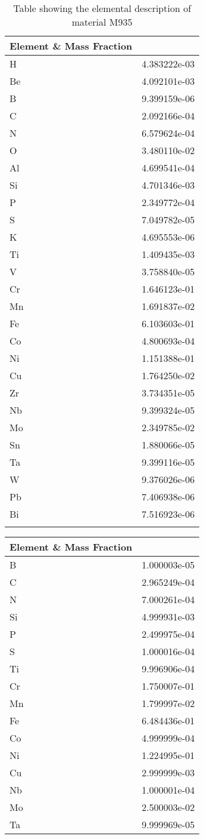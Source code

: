 \begin{centering}
\begin{longtable}[ht!]
{ p{} | p{} }
\hline
Element \& Mass Fraction\\
\hline
H &  4.383222e-03\\
Be &  4.092101e-03\\
B &  9.399159e-06\\
C &  2.092166e-04\\
N &  6.579624e-04\\
O &  3.480110e-02\\
Al &  4.699541e-04\\
Si &  4.701346e-03\\
P &  2.349772e-04\\
S &  7.049782e-05\\
K &  4.695553e-06\\
Ti &  1.409435e-03\\
V &  3.758840e-05\\
Cr &  1.646123e-01\\
Mn &  1.691837e-02\\
Fe &  6.103603e-01\\
Co &  4.800693e-04\\
Ni &  1.151388e-01\\
Cu &  1.764250e-02\\
Zr &  3.734351e-05\\
Nb &  9.399324e-05\\
Mo &  2.349785e-02\\
Sn &  1.880066e-05\\
Ta &  9.399116e-05\\
W &  9.376026e-06\\
Pb &  7.406938e-06\\
Bi &  7.516923e-06\\
\caption{Table showing the elemental description of material M935}
\label{table:material_FirstWall}
\end{longtable}
\clearpage

\begin{longtable}[ht!]
{ p{} | p{} }
\hline
Element \& Mass Fraction\\
\hline
B &  1.000003e-05\\
C &  2.965249e-04\\
N &  7.000261e-04\\
Si &  4.999931e-03\\
P &  2.499975e-04\\
S &  1.000016e-04\\
Ti &  9.996906e-04\\
Cr &  1.750007e-01\\
Mn &  1.799997e-02\\
Fe &  6.484436e-01\\
Co &  4.999999e-04\\
Ni &  1.224995e-01\\
Cu &  2.999999e-03\\
Nb &  1.000001e-04\\
Mo &  2.500003e-02\\
Ta &  9.999969e-05\\


\end{longtable}
\end{centering}
